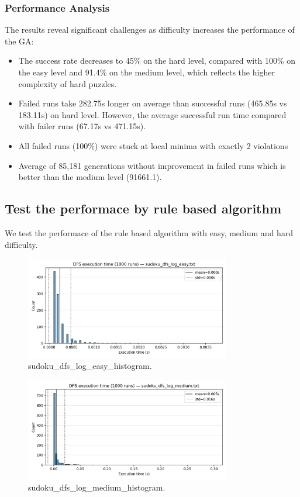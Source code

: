 \subsubsection{Performance Analysis}
The results reveal significant challenges as difficulty increases the performance of the GA:
\begin{itemize}
    \item The success rate decreases to 45\% on the hard level, compared with 100\% on the easy level and 91.4\% on the medium level, which reflects the higher complexity of hard puzzles.
    \item Failed runs take 282.75s longer on average than successful runs (465.85s vs 183.11s) on hard level. However, the average successful run time compared with failer runs (67.17s vs 471.15s).
    \item All failed runs (100\%) were stuck at local minima with exactly 2 violations
    \item Average of 85,181 generations without improvement in failed runs which is better than the medium level (91661.1).
\end{itemize}

\subsection{Test the performace by rule based algorithm}

We test the performace of the rule based algorithm with easy, medium and hard difficulty.

\begin{figure}[H]
\centering
\includegraphics[width=0.8\textwidth]{resources/sudoku_dfs_log_easy_histogram.png}
\caption{sudoku\_dfs\_log\_easy\_histogram.}
\label{fig:sudoku_dfs_log_easy_histogram}
\end{figure}

\begin{figure}[H]
\centering
\includegraphics[width=0.8\textwidth]{resources/sudoku_dfs_log_medium_histogram.png}
\caption{sudoku\_dfs\_log\_medium\_histogram.}
\label{fig:sudoku_dfs_log_medium_histogram}
\end{figure}


